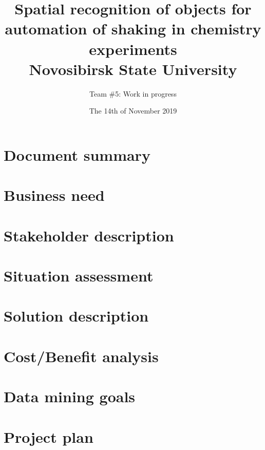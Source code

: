 \documentclass[14pt]{report}
\title{
	{Spatial recognition of objects for automation of shaking in chemistry experiments} \\
	{\large Novosibirsk State University} \\
}
\author{Team \#5: Work in progress}
\date{The 14th of November 2019}
\begin{document}
	
\maketitle
\tableofcontents


\chapter{Document summary}

\thispagestyle{fancy}


\chapter{Business need}

\thispagestyle{fancy}


\chapter{Stakeholder description}

\thispagestyle{fancy}


\chapter{Situation assessment}

\thispagestyle{fancy}


\chapter{Solution description}
\thispagestyle{fancy}


\chapter{Cost/Benefit analysis}

\thispagestyle{fancy}


\chapter{Data mining goals}

\thispagestyle{fancy}


\chapter{Project plan}

\thispagestyle{fancy}

\end{document}
